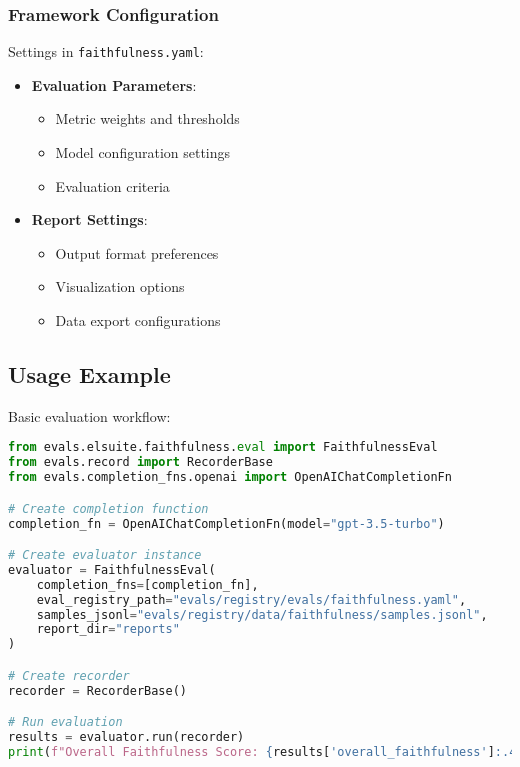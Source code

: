 \subsubsection{Framework Configuration}
Settings in \texttt{faithfulness.yaml}:
\begin{itemize}
    \item \textbf{Evaluation Parameters}:
    \begin{itemize}
        \item Metric weights and thresholds
        \item Model configuration settings
        \item Evaluation criteria
    \end{itemize}
    \item \textbf{Report Settings}:
    \begin{itemize}
        \item Output format preferences
        \item Visualization options
        \item Data export configurations
    \end{itemize}
\end{itemize}

\subsection{Usage Example}
Basic evaluation workflow:

\begin{lstlisting}[language=Python, breaklines=true, basicstyle=\ttfamily\footnotesize]
from evals.elsuite.faithfulness.eval import FaithfulnessEval
from evals.record import RecorderBase
from evals.completion_fns.openai import OpenAIChatCompletionFn

# Create completion function
completion_fn = OpenAIChatCompletionFn(model="gpt-3.5-turbo")

# Create evaluator instance
evaluator = FaithfulnessEval(
    completion_fns=[completion_fn],
    eval_registry_path="evals/registry/evals/faithfulness.yaml",
    samples_jsonl="evals/registry/data/faithfulness/samples.jsonl",
    report_dir="reports"
)

# Create recorder
recorder = RecorderBase()

# Run evaluation
results = evaluator.run(recorder)
print(f"Overall Faithfulness Score: {results['overall_faithfulness']:.4f}")
\end{lstlisting}